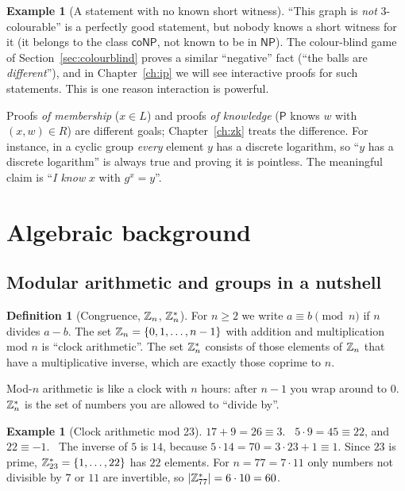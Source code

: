 \documentclass[11pt,a4paper]{report}
\theoremstyle{plain}
\theoremstyle{definition}
\newtheorem{definition}[theorem]{Definition}
\newtheorem{example}[theorem]{Example}
\theoremstyle{remark}
\newcommand{\Prv}{\mathsf{P}}\newcommand{\Ver}{\mathsf{V}}
\newcommand{\NP}{\mathsf{NP}}\newcommand{\BPP}{\mathsf{BPP}}\newcommand{\IP}{\mathsf{IP}}
\newcommand{\coNP}{\mathsf{coNP}}\newcommand{\PCP}{\mathsf{PCP}}
\newcommand{\Z}[1]{\ZZ_{#1}}
\newcommand{\Zs}[1]{\ZZ_{#1}^{*}}
\begin{document}
\begin{example}[A statement with no known short witness]
``This graph is \emph{not} 3-colourable'' is a perfectly good statement, but nobody knows a short witness for it (it belongs to the class $\coNP$, not known to be in $\NP$). The colour-blind game of Section~\ref{sec:colourblind} proves a similar ``negative'' fact (``the balls are \emph{different}''), and in Chapter~\ref{ch:ip} we will see interactive proofs for such statements. This is one reason interaction is powerful.
\end{example}

\begin{plain}\PE
Proofs \emph{of membership} ($x\in L$) and proofs \emph{of knowledge} ($\Prv$ knows $w$ with $(x,w)\in R$) are different goals; Chapter~\ref{ch:zk} treats the difference. For instance, in a cyclic group \emph{every} element $y$ has a discrete logarithm, so ``$y$ has a discrete logarithm'' is always true and proving it is pointless. The meaningful claim is ``\emph{I know} $x$ with $g^x=y$''.
\end{plain}

\section{Algebraic background}
\subsection{Modular arithmetic and groups in a nutshell}
\begin{definition}[Congruence, $\Z n$, $\Zs n$]
For $n\ge2$ we write $a\equiv b\pmod n$ if $n$ divides $a-b$. The set $\Z n=\{0,1,\dots,n-1\}$ with addition and multiplication mod $n$ is ``clock arithmetic''. The set $\Zs n$ consists of those elements of $\Z n$ that have a multiplicative inverse, which are exactly those coprime to $n$.
\end{definition}
\begin{plain}\PE
Mod-$n$ arithmetic is like a clock with $n$ hours: after $n-1$ you wrap around to $0$. $\Zs n$ is the set of numbers you are allowed to ``divide by''.
\end{plain}
\begin{example}[Clock arithmetic mod 23]
$17+9=26\equiv3$. \ $5\cdot9=45\equiv22$, and $22\equiv-1$. \ The inverse of $5$ is $14$, because $5\cdot14=70=3\cdot23+1\equiv1$. Since $23$ is prime, $\Zs{23}=\{1,\dots,22\}$ has $22$ elements. For $n=77=7\cdot11$ only numbers not divisible by $7$ or $11$ are invertible, so $|\Zs{77}|=6\cdot10=60$.
\end{example}
\end{document}
